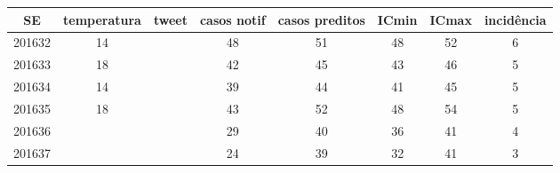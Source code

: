 \begin{tabular}{c|ccccccc}
  \hline
SE & temperatura & tweet & casos notif & casos preditos & ICmin & ICmax & incidência \\ 
  \hline
201632 & 14 &  & 48 & 51 & 48 & 52 & 6 \\ 
  201633 & 18 &  & 42 & 45 & 43 & 46 & 5 \\ 
  201634 & 14 &  & 39 & 44 & 41 & 45 & 5 \\ 
  201635 & 18 &  & 43 & 52 & 48 & 54 & 5 \\ 
  201636 &  &  & 29 & 40 & 36 & 41 & 4 \\ 
  201637 &  &  & 24 & 39 & 32 & 41 & 3 \\ 
   \hline
\end{tabular}

